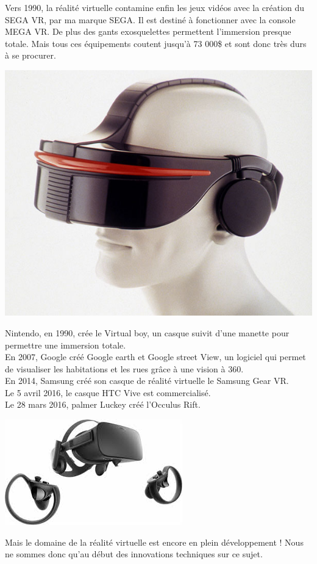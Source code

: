 \documentclass[12pt, a4paper]{report}
\begin{document}
Vers 1990, la réalité virtuelle contamine enfin les jeux vidéos avec la création du SEGA VR, par ma marque SEGA. Il est destiné à fonctionner avec la console MEGA VR. De plus des gants exosquelettes permettent l'immersion presque totale. Mais tous ces équipements coutent jusqu'à 73 000\$ et sont donc très durs à se procurer.
\begin{center}
\includegraphics[scale=0.3]{sega.jpg}
\end{center}


Nintendo, en 1990, crée le Virtual boy, un casque suivit d'une manette pour permettre une immersion totale.\\
En 2007, Google créé Google earth et Google street View, un logiciel qui permet de visualiser les habitations et les rues grâce à une vision à 360.\\
En 2014, Samsung créé son casque de réalité virtuelle le Samsung Gear VR.\\
Le 5 avril 2016, le casque HTC Vive est commercialisé.\\
Le 28 mars 2016, palmer Luckey créé l'Occulus Rift.
\begin{center}
\includegraphics[scale=0.5]{occulus.jpeg}
\end{center}
Mais le domaine de la réalité virtuelle est encore en plein développement !
Nous ne sommes donc qu'au début des innovations techniques sur ce sujet.
\end{document}
